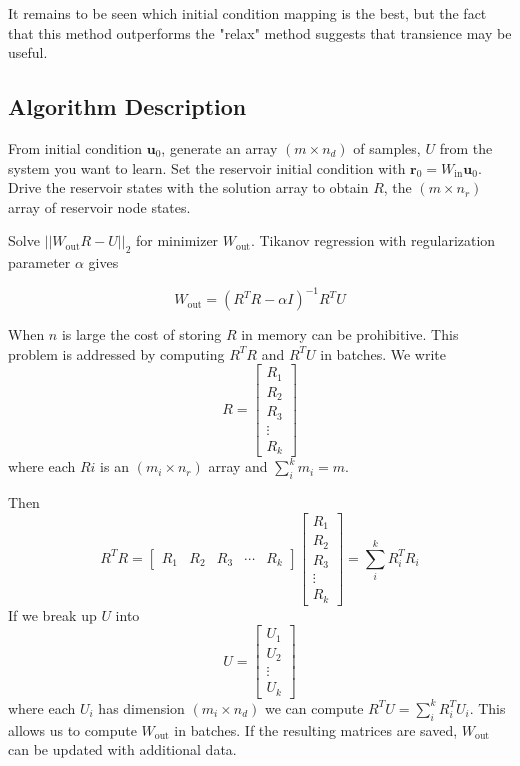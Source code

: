 \documentclass{article}
\begin{document}
It remains to be seen which initial condition mapping is the best, but the fact that this method outperforms  the "relax" method suggests that transience may be useful.

\subsection*{Algorithm Description}
From initial condition $\mathbf{u}_0$, generate an array $(m \times n_d)$ of samples, $U$ from the system you want to learn.
Set the reservoir initial condition with $\mathbf{r}_0=W_\text{in} \mathbf{u}_0$. Drive the reservoir states with the solution array to obtain $R$, the $(m \times n_r)$ array of reservoir node states.

Solve $||W_\text{out} R - U||_2$ for minimizer $W_\text{out}$. Tikanov regression with regularization parameter  $\alpha$ gives

\[
W_\text{out} = (R^TR - \alpha I)^{-1} R^T U
\]

When $n$ is large the cost of storing $R$ in memory can be prohibitive. This problem is addressed by computing $R^TR$ and $R^TU$ in batches. We write
\[
R = \begin{bmatrix}
R_1 \\
R_2\\
R_3 \\
\vdots  \\
R_k
\end{bmatrix}  
\]
where each $Ri$ is an $(m_i \times n_r)$ array and $\sum_i^k m_i = m$.

Then 
\[
R^TR = 
\begin{bmatrix}
R_1 &  R_2 & R_3 & \cdots & R_k
\end{bmatrix}  
\begin{bmatrix}
R_1 \\ 
R_2\\
R_3 \\
\vdots \\ 
R_k
\end{bmatrix}  = \sum_i^k R_i^T R_i
\]
If we break up $U$ into 
\[
U = 
\begin{bmatrix}
U_1 \\ U_2 \\  \vdots \\ U_k
\end{bmatrix} 
\]where each $U_i$ has dimension $(m_i \times n_d)$ we can compute $R^TU = \sum_i^k R_i^T U_i$. This allows us to compute $W_\text{out}$ in batches. If the resulting matrices are saved, $W_\text{out}$ can be updated with additional data.
\end{document}
